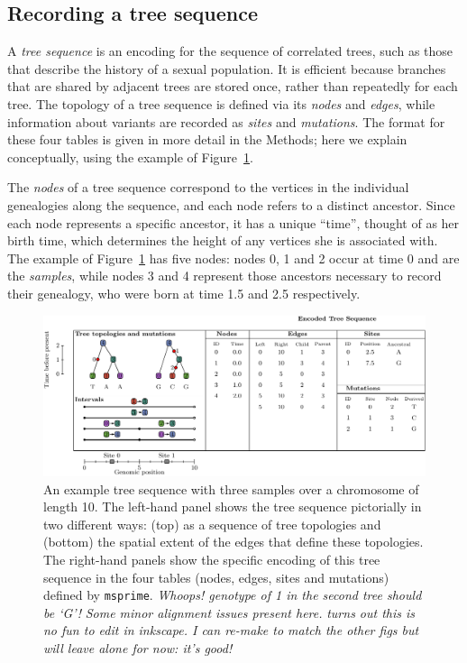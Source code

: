 \documentclass{article}
\newcommand{\msprime}{\texttt{msprime}}
\newcommand{\plr}[1]{{\em \color{blue} #1}}
\newcommand{\jk}[1]{{\em \color{red} #1}}
\begin{document}
\subsection*{Recording a tree sequence}

A \emph{tree sequence} is an encoding for the sequence of correlated trees,
such as those that describe the history of a sexual population.
It is efficient because branches that are shared by adjacent trees are stored once, 
rather than repeatedly for each tree.
The topology of a tree sequence is defined via its \emph{nodes} and \emph{edges},
while information about variants are recorded as \emph{sites} and \emph{mutations}.
The format for these four tables is given in more detail in the Methods;
here we explain conceptually,
using the example of Figure~\ref{fig:example_tree_sequence}.

The \emph{nodes} of a tree sequence 
correspond to the vertices in the individual genealogies along the sequence,
and each node refers to a distinct ancestor.
Since each node represents a specific ancestor, it has a unique ``time'',
thought of as her birth time, which determines the height of any vertices
she is associated with. 
The example of Figure~\ref{fig:example_tree_sequence} has five nodes:
nodes 0, 1 and 2 occur at time 0 and are the \emph{samples},
while nodes 3 and 4 represent those ancestors necessary to record their genealogy,
who were born at time 1.5 and 2.5 respectively.

\begin{figure}
    \begin{center}
        \includegraphics[width=\textwidth]{example_tree_sequence}
    \end{center}
    \caption{
        An example tree sequence with three samples over a chromosome of length 10.
        The left-hand panel shows the tree sequence pictorially in two different ways:
        (top) as a sequence of tree topologies 
        and (bottom) the spatial extent of the edges that define these topologies. 
        The right-hand panels show the specific encoding
        of this tree sequence in the four tables (nodes, edges, sites and mutations) 
        defined by \msprime.
        \plr{Whoops!  genotype of 1 in the second tree should be `G'!}
        \jk{Some minor alignment issues present here.}
        \plr{turns out this is no fun to edit in inkscape.  
            I can re-make to match the other figs
            but will leave alone for now: it's good!}
        \label{fig:example_tree_sequence}
    }
\end{figure}
\end{document}
